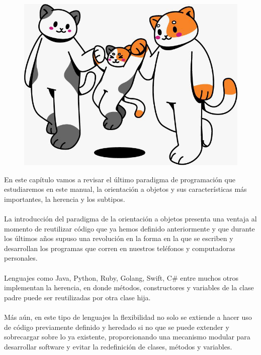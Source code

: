 
\begin{figure}[htbp]
    \centerline{\includegraphics[scale=.5]{assets/10_gatitos_familia.jpg}}
\end{figure}

En este capítulo vamos a revisar el último paradigma de programación que estudiaremos en este manual, la orientación a objetos y sus características más importantes, la herencia y los subtipos.\\\\
La introducción del paradigma de la orientación a objetos presenta una ventaja al momento de reutilizar código que ya hemos definido anteriormente y que durante los últimos años supuso una revolución en la forma en la que se escriben y desarrollan los programas que corren en nuestros teléfonos y computadoras personales.\\\\
Lenguajes como \textsf{Java},  \textsf{Python}, \textsf{Ruby}, \textsf{Golang}, \textsf{Swift}, \textsf{C\#} entre muchos otros implementan la herencia, en donde métodos, constructores y variables de la clase padre puede ser reutilizadas por otra clase hija.\\\\
Más aún, en este tipo de lenguajes la flexibilidad no solo se extiende a hacer uso de código previamente definido y heredado si no que se puede extender y sobrecargar sobre lo ya existente, proporcionando una mecanismo modular para desarrollar software y evitar la redefinición de clases, métodos y variables. 

